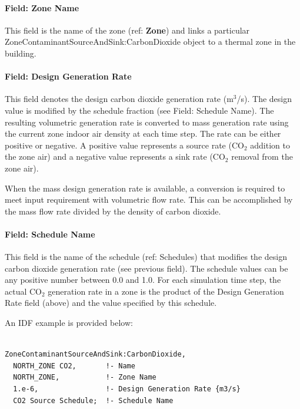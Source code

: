 \paragraph{Field: Zone Name}\label{field-zone-name-2-003}

This field is the name of the zone (ref: \textbf{Zone}) and links a particular ZoneContaminantSourceAndSink:CarbonDioxide object to a thermal zone in the building.

\paragraph{Field: Design Generation Rate}\label{field-design-generation-rate}

This field denotes the design carbon dioxide generation rate (m\(^{3}\)/s). The design value is modified by the schedule fraction (see Field: Schedule Name). The resulting volumetric generation rate is converted to mass generation rate using the current zone indoor air density at each time step. The rate can be either positive or negative. A positive value represents a source rate (CO\(_{2}\) addition to the zone air) and a negative value represents a sink rate (CO\(_{2}\) removal from the zone air).

When the mass design generation rate is available, a conversion is required to meet input requirement with volumetric flow rate. This can be accomplished by the mass flow rate divided by the density of carbon dioxide.

\paragraph{Field: Schedule Name}\label{field-schedule-name-6-000}

This field is the name of the schedule (ref: Schedules) that modifies the design carbon dioxide generation rate (see previous field). The schedule values can be any positive number between 0.0 and 1.0. For each simulation time step, the actual CO\(_{2}\) generation rate in a zone is the product of the Design Generation Rate field (above) and the value specified by this schedule.

An IDF example is provided below:

\begin{lstlisting}

ZoneContaminantSourceAndSink:CarbonDioxide,
  NORTH_ZONE CO2,       !- Name
  NORTH_ZONE,           !- Zone Name
  1.e-6,                !- Design Generation Rate {m3/s}
  CO2 Source Schedule;  !- Schedule Name
\end{lstlisting}

